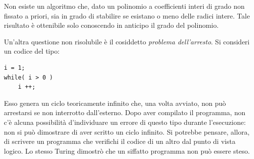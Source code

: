 Non  esiste un algoritmo che, dato un polinomio a coefficienti interi di grado non fissato a priori, sia in grado di stabilire se esistano o meno delle radici intere.
Tale risultato è ottenibile solo conoscendo in anticipo il grado del polinomio.


Un'altra  questione non risolubile è il cosiddetto \emph{problema dell'arresto}.
Si consideri un codice del tipo:
\begin{lstlisting}
i = 1;
while( i > 0 )
	i ++;
\end{lstlisting}
Esso genera un ciclo teoricamente infinito che, una volta avviato, non può arrestarsi se non interrotto dall'esterno.
Dopo aver compilato il programma, non c'è alcuna possibilità d'individuare un errore di questo tipo durante l'esecuzione: non si può dimostrare di aver scritto un ciclo infinito. %
Si potrebbe pensare, allora, di scrivere un programma che verifichi il codice di un altro dal punto di vista logico.
Lo stesso Turing dimostrò che un siffatto programma non può essere steso.

